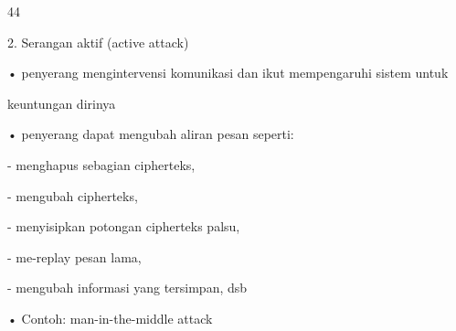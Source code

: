 \documentclass{article}
\begin{document}

44

2. Serangan aktif (active attack) 

• penyerang mengintervensi komunikasi dan ikut mempengaruhi sistem untuk 

keuntungan dirinya 

• penyerang dapat mengubah aliran pesan seperti: 


- menghapus  sebagian cipherteks,  


- mengubah cipherteks, 


- menyisipkan potongan cipherteks palsu, 


- me-replay pesan lama, 


- mengubah informasi yang tersimpan, dsb 

• Contoh: man-in-the-middle attack
\end{document}
